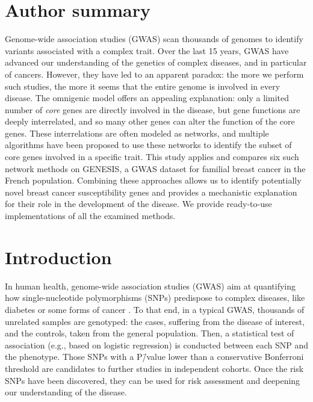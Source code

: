 \documentclass[10pt,letterpaper]{article}
\begin{document}
\section*{Author summary}
Genome-wide association studies (GWAS) scan thousands of genomes to identify variants associated with a complex trait. Over the last 15 years, GWAS have advanced our understanding of the genetics of complex diseases, and in particular of cancers. However, they have led to an apparent paradox: the more we perform such studies, the more it seems that the entire genome is involved in every disease. The omnigenic model offers an appealing explanation: only a limited number of \emph{core} genes are directly involved in the disease, but gene functions are deeply interrelated, and so many other genes can alter the function of the core genes. These interrelations are often modeled as networks, and multiple algorithms have been proposed to use these networks to identify the subset of core genes involved in a specific trait. This study applies and compares six such network methods on GENESIS, a GWAS dataset for familial breast cancer in the French population. Combining these approaches allows us to identify potentially novel breast cancer susceptibility genes and provides a mechanistic explanation for their role in the development of the disease. We provide ready-to-use implementations of all the examined methods.
\linenumbers

\section{Introduction}

In human health, genome-wide association studies (GWAS) aim at quantifying how single-nucleotide polymorphisms (SNPs) predispose to complex diseases, like diabetes or some forms of cancer \cite{bush_chapter_2012}. To that end, in a typical GWAS, thousands of unrelated samples are genotyped: the cases, suffering from the disease of interest, and the controls, taken from the general population. Then, a statistical test of association (e.g., based on logistic regression) is conducted between each SNP and the phenotype. Those SNPs with a P\=/value lower than a conservative Bonferroni threshold are candidates to further studies in independent cohorts. Once the risk SNPs have been discovered, they can be used for risk assessment and deepening our understanding of the disease.
\end{document}
